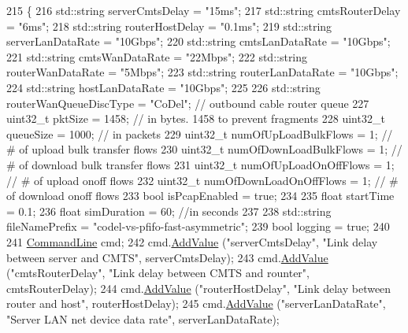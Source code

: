 \begin{DoxyCode}
215 \{
216   std::string serverCmtsDelay = \textcolor{stringliteral}{"15ms"};
217   std::string cmtsRouterDelay = \textcolor{stringliteral}{"6ms"};
218   std::string routerHostDelay = \textcolor{stringliteral}{"0.1ms"};
219   std::string serverLanDataRate = \textcolor{stringliteral}{"10Gbps"};
220   std::string cmtsLanDataRate = \textcolor{stringliteral}{"10Gbps"};
221   std::string cmtsWanDataRate = \textcolor{stringliteral}{"22Mbps"};
222   std::string routerWanDataRate = \textcolor{stringliteral}{"5Mbps"};
223   std::string routerLanDataRate = \textcolor{stringliteral}{"10Gbps"};
224   std::string hostLanDataRate = \textcolor{stringliteral}{"10Gbps"};
225 
226   std::string routerWanQueueDiscType = \textcolor{stringliteral}{"CoDel"};           \textcolor{comment}{// outbound cable router queue}
227   uint32\_t pktSize = 1458;                \textcolor{comment}{// in bytes. 1458 to prevent fragments}
228   uint32\_t queueSize = 1000;              \textcolor{comment}{// in packets}
229   uint32\_t numOfUpLoadBulkFlows = 1;      \textcolor{comment}{// # of upload bulk transfer flows}
230   uint32\_t numOfDownLoadBulkFlows = 1;    \textcolor{comment}{// # of download bulk transfer flows}
231   uint32\_t numOfUpLoadOnOffFlows = 1;     \textcolor{comment}{// # of upload onoff flows}
232   uint32\_t numOfDownLoadOnOffFlows = 1;   \textcolor{comment}{// # of download onoff flows}
233   \textcolor{keywordtype}{bool} isPcapEnabled = \textcolor{keyword}{true};
234 
235   \textcolor{keywordtype}{float} startTime = 0.1;
236   \textcolor{keywordtype}{float} simDuration = 60;        \textcolor{comment}{//in seconds}
237 
238   std::string fileNamePrefix = \textcolor{stringliteral}{"codel-vs-pfifo-fast-asymmetric"};
239   \textcolor{keywordtype}{bool} logging = \textcolor{keyword}{true};
240 
241   \hyperlink{classns3_1_1CommandLine}{CommandLine} cmd;
242   cmd.\hyperlink{classns3_1_1CommandLine_addcfb546c7ad4c8bd0965654d55beb8e}{AddValue} (\textcolor{stringliteral}{"serverCmtsDelay"}, \textcolor{stringliteral}{"Link delay between server and CMTS"}, serverCmtsDelay);
243   cmd.\hyperlink{classns3_1_1CommandLine_addcfb546c7ad4c8bd0965654d55beb8e}{AddValue} (\textcolor{stringliteral}{"cmtsRouterDelay"}, \textcolor{stringliteral}{"Link delay between CMTS and rounter"}, cmtsRouterDelay);
244   cmd.\hyperlink{classns3_1_1CommandLine_addcfb546c7ad4c8bd0965654d55beb8e}{AddValue} (\textcolor{stringliteral}{"routerHostDelay"}, \textcolor{stringliteral}{"Link delay between router and host"}, routerHostDelay);
245   cmd.\hyperlink{classns3_1_1CommandLine_addcfb546c7ad4c8bd0965654d55beb8e}{AddValue} (\textcolor{stringliteral}{"serverLanDataRate"}, \textcolor{stringliteral}{"Server LAN net device data rate"}, serverLanDataRate);

\end{DoxyCode}
